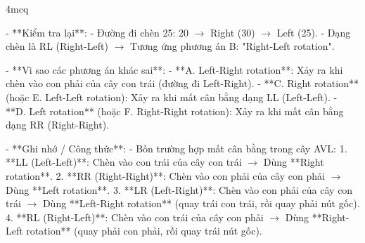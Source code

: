 \begin{question}{4}{mcq}
{- **Kiểm tra lại**:
  - Đường đi chèn 25: 20 \(\rightarrow\) Right (30) \(\rightarrow\) Left (25).
  - Dạng chèn là RL (Right-Left) \(\rightarrow\) Tương ứng phương án B: "Right-Left rotation".

- **Vì sao các phương án khác sai**:
  - **A. Left-Right rotation**: Xảy ra khi chèn vào con phải của cây con trái (đường đi Left-Right).
  - **C. Right rotation** (hoặc E. Left-Left rotation): Xảy ra khi mất cân bằng dạng LL (Left-Left).
  - **D. Left rotation** (hoặc F. Right-Right rotation): Xảy ra khi mất cân bằng dạng RR (Right-Right).

- **Ghi nhớ / Công thức**:
  - Bốn trường hợp mất cân bằng trong cây AVL:
    1. **LL (Left-Left)**: Chèn vào con trái của cây con trái \(\rightarrow\) Dùng **Right rotation**.
    2. **RR (Right-Right)**: Chèn vào con phải của cây con phải \(\rightarrow\) Dùng **Left rotation**.
    3. **LR (Left-Right)**: Chèn vào con phải của cây con trái \(\rightarrow\) Dùng **Left-Right rotation** (quay trái con trái, rồi quay phải nút gốc).
    4. **RL (Right-Left)**: Chèn vào con trái của cây con phải \(\rightarrow\) Dùng **Right-Left rotation** (quay phải con phải, rồi quay trái nút gốc).}
\end{question}

